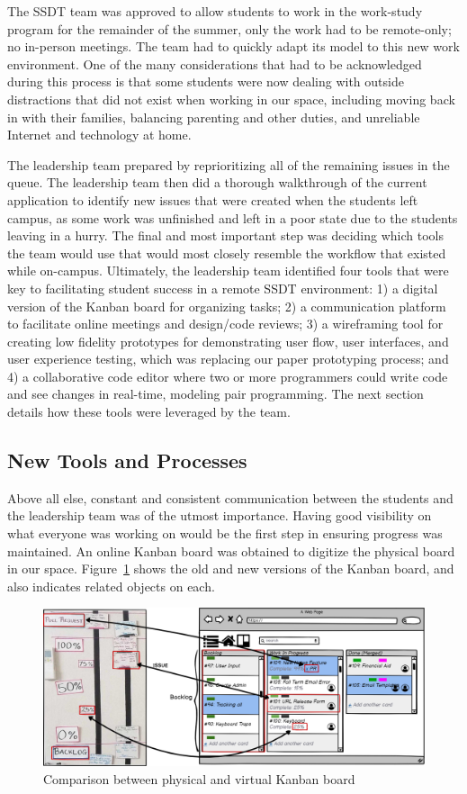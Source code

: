 The SSDT team was approved to allow students to work in the work-study program for the remainder of the summer, only the work had to be remote-only; no in-person meetings. The team had to quickly adapt its model to this new work environment. One of the many considerations that had to be acknowledged during this process is that some students were now dealing with outside distractions that did not exist when working in our space, including moving back in with their families, balancing parenting and other duties, and unreliable Internet and technology at home.

The leadership team prepared by reprioritizing all of the remaining issues in the queue. The leadership team then did a thorough walkthrough of the current application to identify new issues that were created when the students left campus, as some work was unfinished and left in a poor state due to the students leaving in a hurry. The final and most important step was deciding which tools the team would use that would most closely resemble the workflow that existed while on-campus.  Ultimately, the leadership team identified four tools that were key to facilitating student success in a remote SSDT environment: 1) a digital version of the Kanban board for organizing tasks; 2) a communication platform to facilitate online meetings and design/code reviews; 3) a wireframing tool for creating low fidelity prototypes for demonstrating user flow, user interfaces, and user experience testing, which was replacing our paper prototyping process; and 4) a collaborative code editor where two or more programmers could write code and see changes in real-time, modeling pair programming. The next section details how these tools were leveraged by the team.

\subsection{New Tools and Processes}
Above all else, constant and consistent communication between the students and the leadership team was of the utmost importance. Having good visibility on what everyone was working on would be the first step in ensuring progress was maintained. An online Kanban board was obtained to digitize the physical board in our space. Figure~\ref{fig:digitalkanban} shows the old and new versions of the Kanban board, and also indicates related objects on each.

\begin{figure}[h]
 \centering
 \includegraphics[width=\linewidth]{newTrellomockup2.png}
 \caption{Comparison between physical and virtual Kanban board}
 \label{fig:digitalkanban}
\end{figure}

